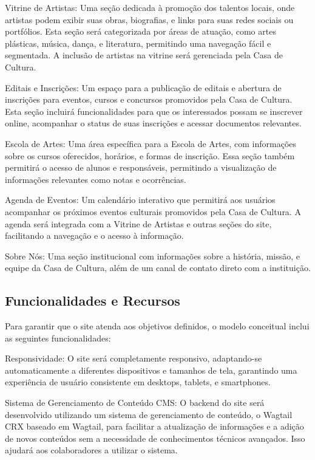 Vitrine de Artistas: Uma seção dedicada à promoção dos talentos locais, onde artistas podem exibir suas obras, biografias, e links para suas redes sociais ou portfólios. Esta seção será categorizada por áreas de atuação, como artes plásticas, música, dança, e literatura, permitindo uma navegação fácil e segmentada. A inclusão de artistas na vitrine será gerenciada pela Casa de Cultura.

Editais e Inscrições: Um espaço para a publicação de editais e abertura de inscrições para eventos, cursos e concursos promovidos pela Casa de Cultura. Esta seção incluirá funcionalidades para que os interessados possam se inscrever online, acompanhar o status de suas inscrições e acessar documentos relevantes.

Escola de Artes: Uma área específica para a Escola de Artes, com informações sobre os cursos oferecidos, horários, e formas de inscrição. Essa seção também permitirá o acesso de alunos e responsáveis, permitindo a visualização de informações relevantes como notas e ocorrências.

Agenda de Eventos: Um calendário interativo que permitirá aos usuários acompanhar os próximos eventos culturais promovidos pela Casa de Cultura. A agenda será integrada com a Vitrine de Artistas e outras seções do site, facilitando a navegação e o acesso à informação.

Sobre Nós: Uma seção institucional com informações sobre a história, missão, e equipe da Casa de Cultura, além de um canal de contato direto com a instituição.

\subsection{Funcionalidades e Recursos}

Para garantir que o site atenda aos objetivos definidos, o modelo conceitual inclui as seguintes funcionalidades:

Responsividade: O site será completamente responsivo, adaptando-se automaticamente a diferentes dispositivos e tamanhos de tela, garantindo uma experiência de usuário consistente em desktops, tablets, e smartphones.

Sistema de Gerenciamento de Conteúdo \ac{CMS}: O backend do site será desenvolvido utilizando um sistema de gerenciamento de conteúdo, o Wagtail CRX baseado em Wagtail, para facilitar a atualização de informações e a adição de novos conteúdos sem a necessidade de conhecimentos técnicos avançados. Isso ajudará aos colaboradores a utilizar o sistema.

